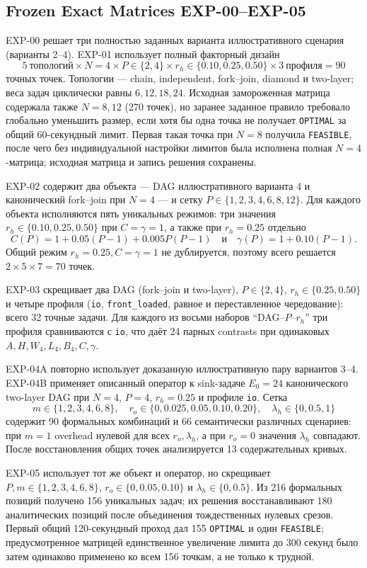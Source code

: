 \subsection{Frozen Exact Matrices EXP-00--EXP-05}

EXP-00 решает три полностью заданных варианта иллюстративного сценария
(варианты 2--4). EXP-01 использует полный факторный дизайн
\[
  5\ \text{топологий}\times N{=}4\times
  P\in\{2,4\}\times r_h\in\{0.10,0.25,0.50\}\times
  3\ \text{профиля}=90
\]
точных точек. Топологии --- chain, independent, fork--join, diamond и
two-layer; веса задач циклически равны $6,12,18,24$. Исходная замороженная
матрица содержала также $N=8,12$ (270 точек), но заранее заданное правило
требовало глобально уменьшить размер, если хотя бы одна точка не получает
\texttt{OPTIMAL} за общий 60-секундный лимит. Первая такая точка при $N=8$
получила \texttt{FEASIBLE}, после чего без индивидуальной настройки лимитов
была исполнена полная $N=4$-матрица; исходная матрица и запись решения
сохранены.

EXP-02 содержит два объекта --- DAG иллюстративного варианта 4 и канонический
fork--join при $N=4$ --- и сетку
$P\in\{1,2,3,4,6,8,12\}$. Для каждого объекта исполняются пять уникальных
режимов: три значения $r_h\in\{0.10,0.25,0.50\}$ при $C=\gamma=1$, а также
при $r_h=0.25$ отдельно
\[
 C(P)=1+0.05(P-1)+0.005P(P-1)
 \quad\text{и}\quad
 \gamma(P)=1+0.10(P-1).
\]
Общий режим $r_h=0.25,C=\gamma=1$ не дублируется, поэтому всего решается
$2\times5\times7=70$ точек.

EXP-03 скрещивает два DAG (fork--join и two-layer),
$P\in\{2,4\}$, $r_h\in\{0.25,0.50\}$ и четыре профиля
(\texttt{io}, \texttt{front\_loaded}, равное и переставленное чередование):
всего 32 точные задачи. Для каждого из восьми наборов
``DAG--$P$--$r_h$'' три профиля сравниваются с \texttt{io}, что даёт 24
парных contrasts при одинаковых $A,H,W_4,L_4,B_4,C,\gamma$.

EXP-04A повторно использует доказанную иллюстративную пару вариантов 3--4.
EXP-04B применяет описанный оператор к sink-задаче $E_0=24$ канонического
two-layer DAG при $N=4$, $P=4$, $r_h=0.25$ и профиле \texttt{io}. Сетка
\[
 m\in\{1,2,3,4,6,8\},\quad
 r_o\in\{0,0.025,0.05,0.10,0.20\},\quad
 \lambda_h\in\{0,0.5,1\}
\]
содержит 90 формальных комбинаций и 66 семантически различных сценариев:
при $m=1$ overhead нулевой для всех $r_o,\lambda_h$, а при $r_o=0$ значения
$\lambda_h$ совпадают. После восстановления общих точек анализируется 13
содержательных кривых.

EXP-05 использует тот же объект и оператор, но скрещивает
$P,m\in\{1,2,3,4,6,8\}$, $r_o\in\{0,0.05,0.10\}$ и
$\lambda_h\in\{0,0.5\}$. Из 216 формальных позиций получено 156 уникальных
задач; их решения восстанавливают 180 аналитических позиций после объединения
тождественных нулевых срезов. Первый общий 120-секундный проход дал 155
\texttt{OPTIMAL} и один \texttt{FEASIBLE}; предусмотренное матрицей единственное
увеличение лимита до 300 секунд было затем одинаково применено ко всем 156
точкам, а не только к трудной.

